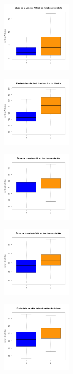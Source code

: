 \documentclass[10pt]{article}
\begin{document}
\begin{center}
	\begin{minipage}[t]{0.3\textwidth}
		\includegraphics[width=35mm]{Figures/Pima/bxp_z_npreg.png}
	\end{minipage}
	\begin{minipage}[t]{0.3\textwidth}
		\includegraphics[width=35mm]{Figures/Pima/bxp_z_glu.png}	
	\end{minipage}
	\begin{minipage}[t]{0.3\textwidth}
		\includegraphics[width=35mm]{Figures/Pima/bxp_z_bp.png}
	\end{minipage}
	\newline
	\begin{minipage}[t]{0.3\textwidth}
		\includegraphics[width=35mm]{Figures/Pima/bxp_z_skin.png}	
	\end{minipage}
	\begin{minipage}[t]{0.3\textwidth}
		\includegraphics[width=35mm]{Figures/Pima/bxp_z_bmi.png}

\end{minipage}
\end{center}
\end{document}
